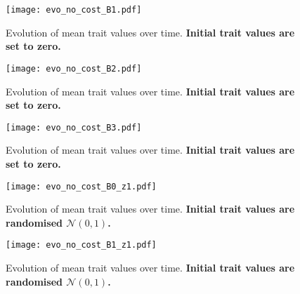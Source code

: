 \documentclass[12pt]{article}
\begin{document}
\begin{figure}
\begin{center}				
\texttt{[image: evo\_no\_cost\_B1.pdf]}
\end{center}
\caption{Evolution of mean trait values over time. \textbf{Initial trait values are set to zero.}}
\end{figure}

\clearpage


\begin{figure}
\begin{center}		
\texttt{[image: evo\_no\_cost\_B2.pdf]}
\end{center}
\caption{Evolution of mean trait values over time. \textbf{Initial trait values are set to zero.}}
\end{figure}

\begin{figure}
\begin{center}				
\texttt{[image: evo\_no\_cost\_B3.pdf]}
\end{center}
\caption{Evolution of mean trait values over time. \textbf{Initial trait values are set to zero.}}
\end{figure}

\clearpage


\begin{figure}
\begin{center}				
\texttt{[image: evo\_no\_cost\_B0\_z1.pdf]}
\end{center}
\caption{Evolution of mean trait values over time. \textbf{Initial trait values are randomised $\mathcal{N}\left(0,1\right)$.}}
\end{figure}

\begin{figure}
\begin{center}				
\texttt{[image: evo\_no\_cost\_B1\_z1.pdf]}
\end{center}
\caption{Evolution of mean trait values over time. \textbf{Initial trait values are randomised $\mathcal{N}\left(0,1\right)$.}}
\end{figure}

\clearpage

\end{document}
